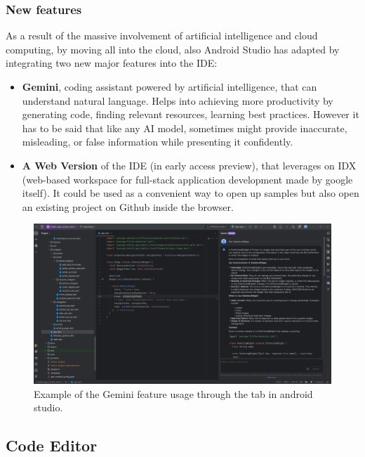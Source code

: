\subsubsection{New features}

As a result of the massive involvement of artificial intelligence and cloud computing, by moving all into the cloud, also Android Studio has adapted by integrating two new major features into the IDE\cite{AndroidStudioNewFeatures}:

\begin{itemize}[nosep] %
    \item \textbf{Gemini}, coding assistant powered by artificial intelligence, that can understand natural language. Helps into achieving more productivity by generating code, finding relevant resources, learning best practices. However it has to be said that like any AI model, sometimes might provide inaccurate, misleading, or false information while presenting it confidently.
    \item \textbf{A Web Version} of the IDE (in early access preview), that leverages on IDX (web-based workspace for full-stack application development made by google itself). It could be used as a convenient way to open up samples but also open an existing project on Github inside the browser.
\end{itemize}

\begin{figure}
    \includegraphics[width=1.0\linewidth]{./images/gemini.png}
    \caption{Example of the Gemini feature usage through the tab in android studio.}
\end{figure}

\subsection{Code Editor}

